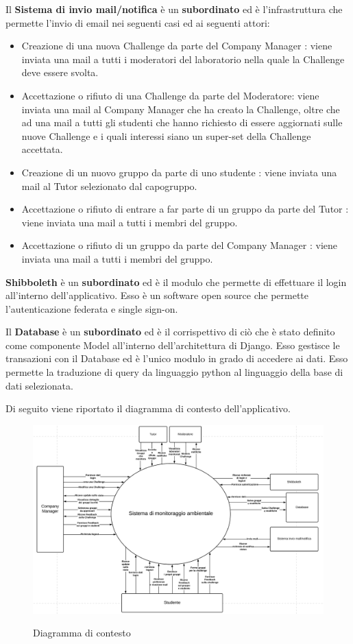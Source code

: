 Il \textbf{Sistema di invio mail/notifica} è un \textbf{subordinato} ed è l'infrastruttura che permette l'invio di email nei seguenti casi ed ai seguenti attori:
\begin{itemize}
    \item Creazione di una nuova Challenge da parte del Company Manager : viene inviata una mail a tutti i moderatori del laboratorio nella quale la Challenge deve essere svolta. 
    \item Accettazione o rifiuto di una Challenge da parte del Moderatore: viene inviata una mail al Company Manager che ha creato la Challenge, oltre che ad una mail a tutti gli studenti che hanno richiesto di essere aggiornati sulle nuove Challenge e i quali interessi siano un super-set della Challenge accettata.
    \item Creazione di un nuovo gruppo da parte di uno studente : viene inviata una mail al Tutor selezionato dal capogruppo.
    \item Accettazione o rifiuto di entrare a far parte di un gruppo da parte del Tutor : viene inviata una mail a tutti i membri del gruppo.
    \item Accettazione o rifiuto di un gruppo da parte del Company Manager : viene inviata una mail a tutti i membri del gruppo.
\end{itemize}

\textbf{Shibboleth} è un \textbf{subordinato} ed è il modulo che permette di effettuare il login all'interno dell'applicativo. Esso è un software open source che permette l'autenticazione federata e single sign-on.

Il \textbf{Database} è un \textbf{subordinato} ed è il corrispettivo di ciò che è stato definito come componente Model all'interno dell'architettura di Django. Esso gestisce le transazioni con il Database ed è l'unico modulo in grado di accedere ai dati. Esso permette la traduzione di query da linguaggio python al linguaggio della base di dati selezionata. 

Di seguito viene riportato il diagramma di contesto dell'applicativo.


\begin{figure}[H]
    \centering
    \includegraphics[scale=0.46]{images/diagrama_di_contesto.png}
    \label{fig:diagrama_di_contesto}
    \caption{Diagramma di contesto}
\end{figure}

